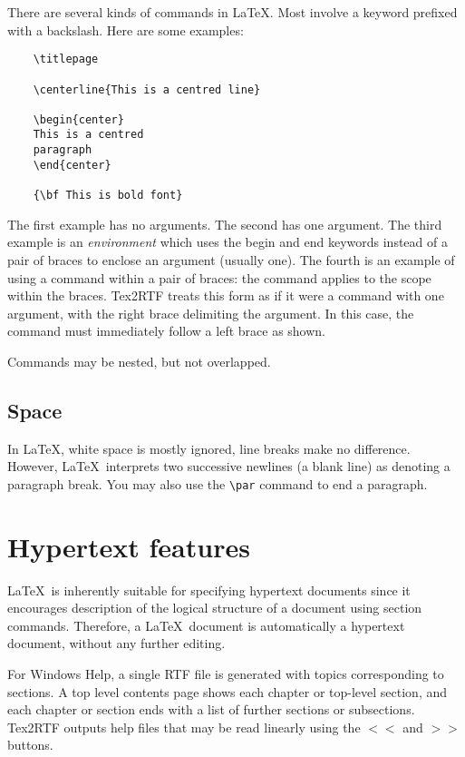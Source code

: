 There are several kinds of commands in \LaTeX. Most involve a keyword
prefixed with a backslash. Here are some examples:

\begin{verbatim}
    \titlepage

    \centerline{This is a centred line}

    \begin{center}
    This is a centred
    paragraph
    \end{center}

    {\bf This is bold font}
\end{verbatim}

The first example has no arguments. The second has one argument. The third
example is an {\it environment} which uses the begin and end keywords instead
of a pair of braces to enclose an argument (usually one). The fourth is an example
of using a command within a pair of braces: the command applies to the scope within
the braces. Tex2RTF treats this form as if it were a command with one argument,
with the right brace delimiting the argument. In this case, the command must
immediately follow a left brace as shown.

Commands may be nested, but not overlapped.

\subsection{Space}%

In \LaTeX, white space is mostly ignored, line breaks make no difference.
However, \LaTeX\ interprets two successive newlines (a blank line) as
denoting a paragraph break. You may also use the \verb$\par$ command to end
a paragraph.

\section{Hypertext features}%

\LaTeX\ is inherently suitable for specifying hypertext documents since
it encourages description of the logical structure of a document using
section commands. Therefore, a \LaTeX\ document is automatically
a hypertext document, without any further editing.

For Windows Help, a single RTF file is generated with topics
corresponding to sections. A top level contents page shows each chapter
or top-level section, and each chapter or section ends with a list of
further sections or subsections. Tex2RTF outputs help files that may be
read linearly using the \rtfsp$<<$ and $>>$ buttons.

